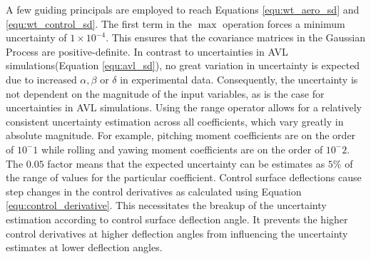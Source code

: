 A few guiding principals are employed to reach Equations \ref{equ:wt_aero_sd} and \ref{equ:wt_control_sd}.
The first term in the $\max$ operation forces a minimum uncertainty of $1\times10^{-4}$.
This ensures that the covariance matrices in the Gaussian Process are positive-definite.
In contrast to uncertainties in AVL simulations(Equation \ref{equ:avl_sd}), no great variation in uncertainty is expected due to increased $\alpha, \beta$ or $\delta$ in experimental data. 
Consequently, the uncertainty is not dependent on the magnitude of the input variables, as is the case for uncertainties in AVL simulations. 
Using the range operator allows for a relatively consistent uncertainty estimation across all coefficients, which vary greatly in absolute magnitude. 
For example, pitching moment coefficients are on the order of $10^-1$ while rolling and yawing moment coefficients are on the order of $10^-2$.
The $0.05$ factor means that the expected uncertainty can be estimates as $5\%$ of the range of values for the particular coefficient. 
Control surface deflections cause step changes in the control derivatives as calculated using Equation \ref{equ:control_derivative}.
This necessitates the breakup of the uncertainty estimation according to control surface deflection angle. 
It prevents the higher control derivatives at higher deflection angles from influencing the uncertainty estimates at lower deflection angles.


